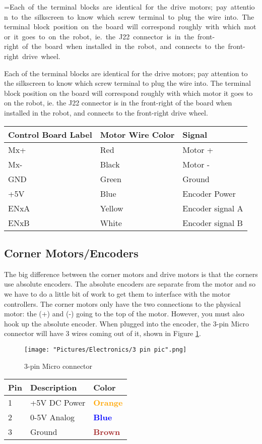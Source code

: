 \documentclass{article}
\makeatletter
\newcommand{\mybox}[1]{%
  \setbox0=\hbox{#1}%
  \setlength{\@tempdima}{\dimexpr\wd0+13pt}%
  \begin{tcolorbox}[colframe=mycolor,boxrule=0.5pt,arc=4pt,
      left=6pt,right=6pt,top=6pt,bottom=6pt,boxsep=0pt,width=0.95\textwidth]
    #1
  \end{tcolorbox}
}
\makeatother
\begin{document}
\mybox{Each of the terminal blocks are identical for the drive motors; pay attention to the silkscreen to know which screw terminal to plug the wire into. The terminal block position on the board will correspond roughly with which motor it goes to on the robot, ie. the J22 connector is in the front-right of the board when installed in the robot, and connects to the front-right drive wheel. }

\begin{tabular}[3] {| l | l | l |}
	\hline
	\textbf{Control Board Label} & \textbf{Motor Wire Color} & \textbf{Signal} \\ \hline
	Mx+ & Red & Motor + \\ \hline
	Mx- & Black & Motor - \\ \hline
	GND & Green & Ground \\ \hline
	+5V & Blue & Encoder Power \\ \hline
	ENxA & Yellow & Encoder signal A \\ \hline
	ENxB & White & Encoder signal B \\ \hline
	\hline
\end{tabular}


\subsection{Corner Motors/Encoders}
The big difference between the corner motors and drive motors is that the corners use absolute encoders. The absolute encoders are separate from the motor and so we have to do a little bit of work to get them to interface with the motor controllers. The corner motors only have the two connections to the physical motor: the (+) and (-) going to the top of the motor. However, you must also hook up the absolute encoder. When plugged into the encoder, the 3-pin Micro connector will have 3 wires coming out of it, shown in Figure \ref{3pin}.

\bigskip 

\begin{figure}[H]
 	\centering
	\texttt{[image: "Pictures/Electronics/3 pin pic".png]}
 	\caption{3-pin Micro connector}
	\label{3pin}
\end{figure}

\bigskip
\begin{tabular}[3] {| p{3cm} | p{7cm} | p{3cm} | }
	\hline
	\textbf{Pin} & \textbf{Description} & \textbf{Color} \\ \hline
	1 & +5V DC Power & \textcolor{orange}{\textbf{Orange}} \\ \hline
	2 & 0-5V Analog & \textcolor{blue}{\textbf{Blue}} \\ \hline
	3 & Ground & \textcolor{brown}{\textbf{Brown}} \\ \hline
\end{tabular}
\end{document}
